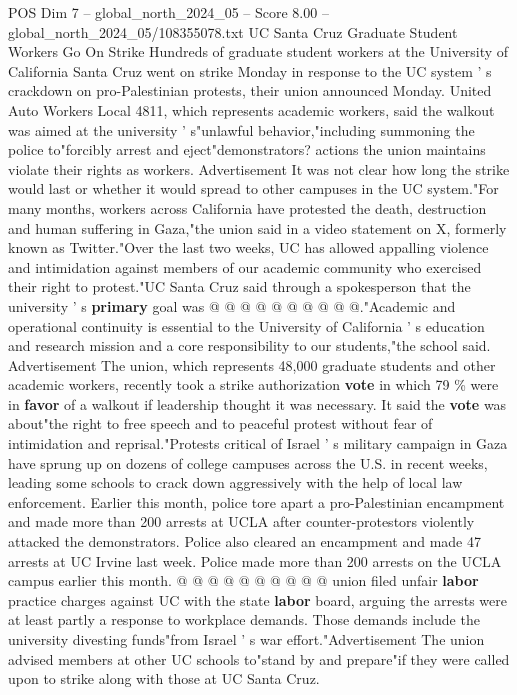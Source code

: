 \begin{textsample}{POS Dim 7 – global\_north\_2024\_05 – Score 8.00 – global\_north\_2024\_05/108355078.txt}  \label{ex:f7_pos_057}
UC Santa Cruz Graduate Student Workers Go On Strike Hundreds of graduate student workers at the University of California Santa Cruz went on strike Monday in response to the UC system ' s crackdown on pro-Palestinian protests, their union announced Monday.
United Auto Workers Local 4811, which represents academic workers, said the walkout was aimed at the university ' s"unlawful behavior,"including summoning the police to"forcibly arrest and eject"demonstrators? actions the union maintains violate their rights as workers.
Advertisement It was not clear how long the strike would last or whether it would spread to other campuses in the UC system."For many months, workers across California have protested the death, destruction and human suffering in Gaza,"the union said in a video statement on X, formerly known as Twitter."Over the last two weeks, UC has allowed appalling violence and intimidation against members of our academic community who exercised their right to protest."UC Santa Cruz said through a spokesperson that the university ' s \textbf{primary} goal was @ @ @ @ @ @ @ @ @ @."Academic and operational continuity is essential to the University of California ' s education and research mission and a core responsibility to our students,"the school said.
Advertisement The union, which represents 48,000 graduate students and other academic workers, recently took a strike authorization \textbf{vote} in which 79 \% were in \textbf{favor} of a walkout if leadership thought it was necessary.
It said the \textbf{vote} was about"the right to free speech and to peaceful protest without fear of intimidation and reprisal."Protests critical of Israel ' s military campaign in Gaza have sprung up on dozens of college campuses across the U.S. in recent weeks, leading some schools to crack down aggressively with the help of local law enforcement.
Earlier this month, police tore apart a pro-Palestinian encampment and made more than 200 arrests at UCLA after counter-protestors violently attacked the demonstrators.
Police also cleared an encampment and made 47 arrests at UC Irvine last week.
Police made more than 200 arrests on the UCLA campus earlier this month. @ @ @ @ @ @ @ @ @ @ union filed unfair \textbf{labor} practice charges against UC with the state \textbf{labor} board, arguing the arrests were at least partly a response to workplace demands.
Those demands include the university divesting funds"from Israel ' s war effort."Advertisement The union advised members at other UC schools to"stand by and prepare"if they were called upon to strike along with those at UC Santa Cruz.

\end{textsample}
